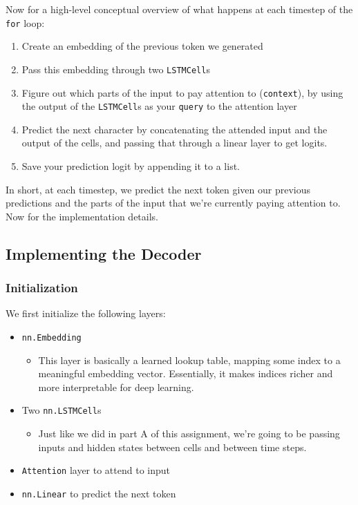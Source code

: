 \documentclass{article}
\newcommand{\ttt}[1]{\texttt{#1}}
\begin{document}
Now for a high-level conceptual overview of what happens at each timestep of the \ttt{for} loop:

\begin{enumerate}
    \item Create an embedding of the previous token we generated
    \item Pass this embedding through two \ttt{LSTMCell}s
    \item Figure out which parts of the input to pay attention to (\ttt{context}), by using the output of the \ttt{LSTMCell}s as your \ttt{query} to the attention layer
    \item Predict the next character by concatenating the attended input and the output of the cells, and passing that through a linear layer to get logits.
    \item Save your prediction logit by appending it to a list.
\end{enumerate}

In short, at each timestep, we predict the next token given our previous predictions and the parts of the input that we're currently paying attention to. \\

Now for the implementation details.

\newpage

\subsection{Implementing the Decoder}

\subsubsection{Initialization}

We first initialize the following layers:

\begin{itemize}
    \item \ttt{nn.Embedding}
        \begin{itemize}
            \item This layer is basically a learned lookup table, mapping some index to a meaningful embedding vector. Essentially, it makes indices richer and more interpretable for deep learning.
        \end{itemize}
    \item Two \ttt{nn.LSTMCell}s
        \begin{itemize}
            \item Just like we did in part A of this assignment, we're going to be passing inputs and hidden states between cells and between time steps.
        \end{itemize}
    \item \ttt{Attention} layer to attend to input
    \item \ttt{nn.Linear} to predict the next token
\end{itemize}
\end{document}
